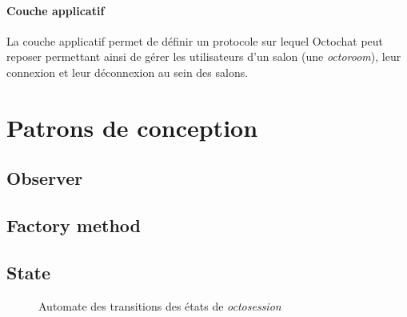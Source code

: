 \documentclass[a4paper]{article}
\begin{document}
			\paragraph{Couche applicatif}{
			La couche applicatif permet de définir un protocole sur lequel Octochat peut reposer permettant ainsi
			de gérer les utilisateurs d'un salon (une \textit{octoroom}), leur connexion et leur déconnexion au sein
			des salons.
			}
		\newpage

	\section{Patrons de conception}
		\subsection{Observer}
		\subsection{Factory method}
		\subsection{State}
			\begin{center}
				\begin{figure}
					
					\caption{\label{state_schema} Automate des transitions des états de \textit{octosession}}
				\end{figure}
			\end{center}
\end{document}
